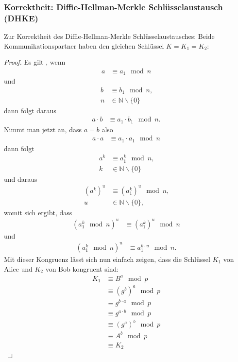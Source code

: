 \documentclass[
  a4paper,
  11pt,
]{scrartcl}
\theoremstyle{plain}
\theoremstyle{definition}
\theoremstyle{remark}
\newcommand{\N}{\mathbb{N}}
\begin{document}
\subsubsection{Korrektheit: Diffie-Hellman-Merkle Schlüsselaustausch (DHKE)}
\label{sub:dhke_proof}
Zur Korrektheit des Diffie-Hellman-Merkle Schlüsselaustausches: Beide Kommunikationspartner haben den gleichen Schlüssel $K = K_1 = K_2$:
\begin{proof}
Es gilt , wenn 
\begin{align*}
a & \equiv a_1 \mod n
\end{align*}
und
\begin{align*}
b & \equiv b_1 \mod n \text{,}\\
n & \in \N \backslash \{0\}
\end{align*}
dann folgt daraus
\begin{align*}
a \cdot b & \equiv a_1 \cdot b_1 \mod n \text{.}
\end{align*}
Nimmt man jetzt an, dass $a=b$ also
\begin{align*}
a \cdot a & \equiv a_1 \cdot a_1 \mod n
\end{align*}
dann folgt
\begin{align*}
a^k & \equiv a_1^k \mod n \text{,}\\
k & \in \N \backslash \{0\}
\end{align*}
und daraus
\begin{align*}
(a^k)^u & \equiv (a_1^k)^u \mod n \text{,}\\
u & \in \N \backslash \{0\}\text{,}
\end{align*}
womit sich ergibt, dass
\begin{align*}
(a_1^k \mod n)^u & \equiv (a_1^k)^u \mod n
\end{align*}
und
\begin{align*}
(a_1^k \mod n)^u & \equiv a_1^{k\cdot u} \mod n \text{.}
\end{align*}
Mit dieser Kongruenz lässt sich nun einfach zeigen, dass die Schlüssel $K_1$ von Alice und $K_2$ von Bob kongruent sind:
\begin{align*}
K_1 & \equiv B^a \mod p\\
& \equiv (g^b)^a \mod p\\
& \equiv g^{b \cdot a} \mod p\\
& \equiv g^{a \cdot b} \mod p\\
& \equiv (g^a)^b \mod p\\
& \equiv A^b \mod p\\
& \equiv K_2
\end{align*}
\end{proof}
\end{document}
